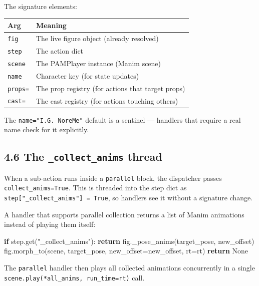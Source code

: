 \documentclass[
  11pt,
]{book}
\newenvironment{Shaded}{}{}
\newcommand{\ControlFlowTok}[1]{\textcolor[rgb]{0.00,0.44,0.13}{\textbf{#1}}}
\newcommand{\NormalTok}[1]{#1}
\newcommand{\OperatorTok}[1]{\textcolor[rgb]{0.40,0.40,0.40}{#1}}
\newcommand{\StringTok}[1]{\textcolor[rgb]{0.25,0.44,0.63}{#1}}
\newcommand{\VariableTok}[1]{\textcolor[rgb]{0.10,0.09,0.49}{#1}}
\begin{document}
The signature elements:

\begin{longtable}[]{@{}ll@{}}
\toprule\noalign{}
Arg & Meaning \\
\midrule\noalign{}
\endhead
\bottomrule\noalign{}
\endlastfoot
\texttt{fig} & The live figure object (already resolved) \\
\texttt{step} & The action dict \\
\texttt{scene} & The PAMPlayer instance (Manim scene) \\
\texttt{name} & Character key (for state updates) \\
\texttt{props=} & The prop registry (for actions that target props) \\
\texttt{cast=} & The cast registry (for actions touching others) \\
\end{longtable}

The \texttt{name="I.G.\ NoreMe"} default is a sentinel --- handlers that
require a real name check for it explicitly.

\subsection{\texorpdfstring{4.6 The \texttt{\_collect\_anims}
thread}{4.6 The \_collect\_anims thread}}\label{the-_collect_anims-thread}

When a sub-action runs inside a \texttt{parallel} block, the dispatcher
passes \texttt{collect\_anims=True}. This is threaded into the step dict
as \texttt{step{[}"\_collect\_anims"{]}\ =\ True}, so handlers see it
without a signature change.

A handler that supports parallel collection returns a list of Manim
animations instead of playing them itself:

\begin{Shaded}
\begin{Highlighting}[]
\ControlFlowTok{if}\NormalTok{ step.get(}\StringTok{"\_collect\_anims"}\NormalTok{):}
    \ControlFlowTok{return}\NormalTok{ fig.\_pose\_anims(target\_pose, new\_offset)}
\NormalTok{fig.morph\_to(scene, target\_pose, new\_offset}\OperatorTok{=}\NormalTok{new\_offset, rt}\OperatorTok{=}\NormalTok{rt)}
\ControlFlowTok{return} \VariableTok{None}
\end{Highlighting}
\end{Shaded}

The \texttt{parallel} handler then plays all collected animations
concurrently in a single \texttt{scene.play(*all\_anims,\ run\_time=rt)}
call.
\end{document}
